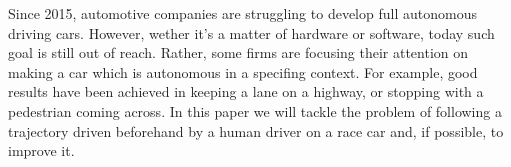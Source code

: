 Since 2015, automotive companies are struggling to develop full autonomous driving cars. However, wether it's a matter of hardware or software, today such goal is still out of reach. Rather, some firms are focusing their attention on making a car which is autonomous in a specifing context. For example, good results have been achieved in keeping a lane on a highway, or stopping with a pedestrian coming across. 
In this paper we will tackle the problem of following a trajectory driven beforehand by a human driver on a race car and, if possible, to improve it.




\cite{playingforbenchmarks}

























